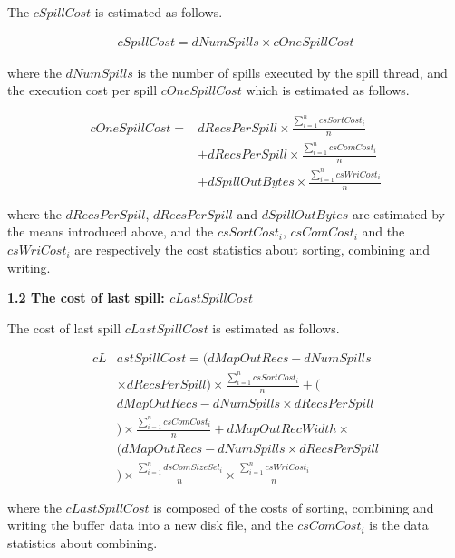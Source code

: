 The $cSpillCost$ is estimated as follows.
\begin{small}
\begin{equation}
\begin{split}
cSpillCost=dNumSpills\times cOneSpillCost
\end{split}
\end{equation}
\end{small}
where the $dNumSpills$ is the number of spills executed by the spill thread, and the execution cost per spill $cOneSpillCost$ which is estimated as follows.
\begin{small}
\begin{equation}	
\begin{split}
cOneSpillCost=&dRecsPerSpill\times \frac{\sum_{i=1}^ncsSortCost_i}{n}\\
&+dRecsPerSpill\times \frac{\sum_{i=1}^ncsComCost_i}{n}\\
&+dSpillOutBytes\times \frac{\sum_{i=1}^ncsWriCost_i}{n} \nonumber
\end{split}
\end{equation}
\end{small}
where the $dRecsPerSpill$, $dRecsPerSpill$ and $dSpillOutBytes$ are estimated by the means introduced above, and the $csSortCost_i$, $csComCost_i$ and the $csWriCost_i$ are respectively the cost statistics about sorting, combining and writing.

\noindent\textbf{1.2 The cost of last spill: $cLastSpillCost$}

The cost of last spill $cLastSpillCost$ is estimated as follows.
\begin{small}
\begin{equation}
\begin{split}
cL&astSpillCost=(dMapOutRecs-dNumSpills\\
&\times  dRecsPerSpill)\times \frac{\sum_{i=1}^ncsSortCost_i}{n}+(  \\
&dMapOutRecs-dNumSpills\times dRecsPerSpill\\
&)\times \frac{\sum_{i=1}^ncsComCost_i}{n}+dMapOutRecWidth\times  \\
&(dMapOutRecs-dNumSpills\times dRecsPerSpill\\
&)\times \frac{\sum_{i=1}^ndsComSizeSel_i}{n}\times \frac{\sum_{i=1}^ncsWriCost_i}{n}
\end{split}
\end{equation}
\end{small}
where the $cLastSpillCost$ is composed of the costs of sorting, combining and writing the buffer data into a new disk file, and the $csComCost_i$ is the data statistics about combining. 

